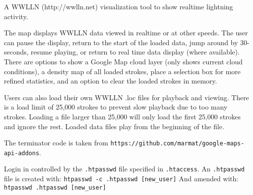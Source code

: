 A WWLLN (http://wwlln.net) visualization tool to show realtime lightning activity.

The map displays WWLLN data viewed in realtime or at other speeds.
The user can pause the display, return to the start of the loaded data, jump around by 30-seconds, resume playing, or return to real time data display (where available).
There are options to show a Google Map cloud layer (only shows current cloud conditions), a density map of all loaded strokes, place a selection box for more refined statistics, and an option to clear the loaded strokes in memory.

Users can also load their own WWLLN .loc files for playback and viewing.
There is a load limit of 25,000 strokes to prevent slow playback due to too many strokes.
Loading a file larger than 25,000 will only load the first 25,000 strokes and ignore the rest.
Loaded data files play from the beginning of the file.

The terminator code is taken from \texttt{https://github.com/marmat/google-maps-api-addons}.

Login in controlled by the \texttt{.htpasswd} file specified in \texttt{.htaccess}.  An \texttt{.htpasswd} file is created with: \texttt{htpasswd -c .htpasswd [new\_user]}
And amended with: \texttt{htpasswd .htpasswd [new\_user]}
